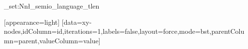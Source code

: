 \begingroup
\ExplSyntaxOn\tl_set:Nn\l_semio_language_tl{en}\ExplSyntaxOff
\begin{VizFigure}[width=80,height=40,title={}]
[appearance=light]
[data={xy-nodes},idColumn={id},iterations={1},labels={false},layout={force},mode={bst},parentColumn={parent},valueColumn={value}]
\end{VizFigure}
\endgroup
